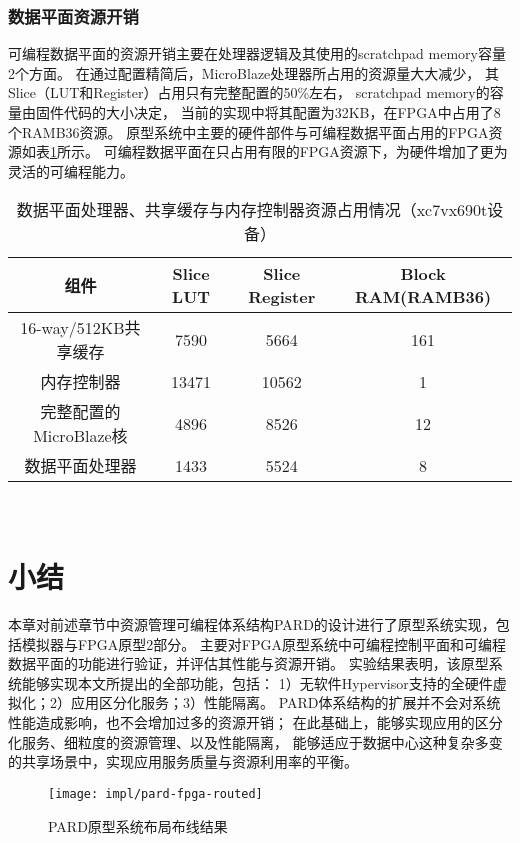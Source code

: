 \subsubsection{数据平面资源开销}

可编程数据平面的资源开销主要在处理器逻辑及其使用的scratchpad memory容量2个方面。
在通过配置精简后，MicroBlaze处理器所占用的资源量大大减少，
其Slice（LUT和Register）占用只有完整配置的50\%左右，
scratchpad memory的容量由固件代码的大小决定，
当前的实现中将其配置为32KB，在FPGA中占用了8个RAMB36资源。
原型系统中主要的硬件部件与可编程数据平面占用的FPGA资源如表\ref{tab:pard-dp-resource}所示。
可编程数据平面在只占用有限的FPGA资源下，为硬件增加了更为灵活的可编程能力。

\begin{table}[htb]
  \centering
  \begin{minipage}[t]{0.9\linewidth}
  \caption{数据平面处理器、共享缓存与内存控制器资源占用情况（xc7vx690t设备）}
  \label{tab:pard-dp-resource}
    \begin{tabular*}{\linewidth}{cccc}
      \toprule[1.5pt]
      \textbf{组件} & \textbf{Slice LUT} & \textbf{Slice Register} & \textbf{Block RAM(RAMB36)} \\
      \midrule[1pt]
      16-way/512KB共享缓存    &  7590       &  5664            &  161               \\
      内存控制器              &  13471      &  10562           &  1                 \\
      完整配置的MicroBlaze核  &  4896       &  8526            &  12                \\
      \hline
      数据平面处理器          &  1433       &  5524            &  8                 \\
      \bottomrule[1.5pt]
    \end{tabular*}\\[2pt]
  \end{minipage}
\end{table}


\section{小结}

本章对前述章节中资源管理可编程体系结构PARD的设计进行了原型系统实现，包括模拟器与FPGA原型2部分。
主要对FPGA原型系统中可编程控制平面和可编程数据平面的功能进行验证，并评估其性能与资源开销。
实验结果表明，该原型系统能够实现本文所提出的全部功能，包括：
1）无软件Hypervisor支持的全硬件虚拟化；2）应用区分化服务；3）性能隔离。
PARD体系结构的扩展并不会对系统性能造成影响，也不会增加过多的资源开销；
在此基础上，能够实现应用的区分化服务、细粒度的资源管理、以及性能隔离，
能够适应于数据中心这种复杂多变的共享场景中，实现应用服务质量与资源利用率的平衡。


\begin{figure}[htb]
  \centering
  \texttt{[image: impl/pard-fpga-routed]}
  \caption{PARD原型系统布局布线结果}
  \label{fig:pard-fpga-routed}
\end{figure}

